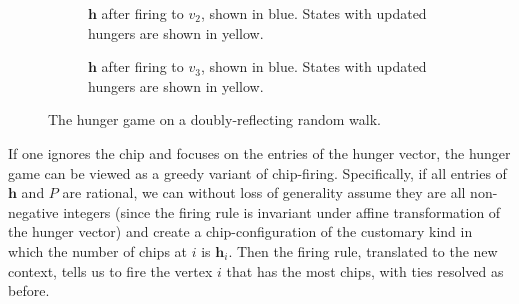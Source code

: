 \begin{example}
\begin{figure}[htbp]
\begin{subfigure}{\textwidth}
        \caption{$\mathbf{h}$ after firing to $v_2$, shown in blue. States with updated hungers are shown in yellow.}
        \label{subfig:ex2fire2}
    \end{subfigure}
    \begin{subfigure}{\textwidth}
        \centering
        \caption{$\mathbf{h}$ after firing to $v_3$, shown in blue. States with updated hungers are shown in yellow.}
        \label{subfig:ex2fire3}
    \end{subfigure}
    \caption{The hunger game on a doubly-reflecting random walk.}
    \label{fig:ex2H}
\end{figure}
\end{example}

If one ignores the chip and focuses on the entries of the hunger vector,
the hunger game can be viewed as a greedy variant of chip-firing.
Specifically, if all entries of $\mathbf{h}$ and $P$ are rational,
we can without loss of generality assume they are all non-negative integers
(since the firing rule is invariant under affine transformation
of the hunger vector) and create a chip-configuration of the customary kind
in which the number of chips at $i$ is $\mathbf{h}_i$. 
Then the firing rule, translated to the new context,
tells us to fire the vertex $i$ that has the most chips,
with ties resolved as before.

